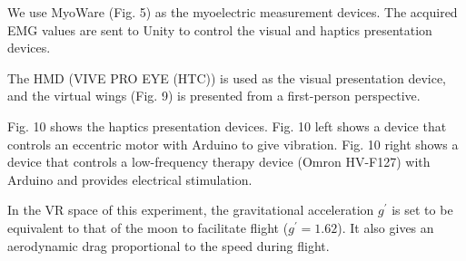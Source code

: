 \documentclass[letterpaper, 10 pt, conference]{ieeeconf}  %
\begin{document}
                We use MyoWare (Fig. 5) as the myoelectric measurement devices.  
                The acquired EMG values are sent to Unity to control the visual and haptics presentation devices.  

                The HMD (VIVE PRO EYE (HTC)) is used as the visual presentation device, and the virtual wings (Fig. 9) is presented from a first-person perspective.  

                
                Fig. 10 shows the haptics presentation devices.  
                Fig. 10 left shows a device that controls an eccentric motor with Arduino to give vibration.  
                Fig. 10 right shows a device that controls a low-frequency therapy device (Omron HV-F127) with Arduino and provides electrical stimulation.  

                In the VR space of this experiment, the gravitational acceleration $g^{\prime}$ is set to be equivalent to that of the moon 
                to facilitate flight ($g^{\prime}=1.62$).
                It also gives an aerodynamic drag 
                proportional to the speed
                during flight.  
\end{document}
